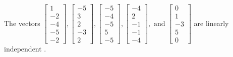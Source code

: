 \begin{exercise}
\begin{exerciseStatement}
  \end{exerciseStatement}
  \begin{exerciseAnswer}
   The vectors \(\left[\begin{array}{r}
1 \\
-2 \\
-4 \\
-5 \\
-2
\end{array}\right] , \left[\begin{array}{r}
-5 \\
3 \\
2 \\
-3 \\
2
\end{array}\right] , \left[\begin{array}{r}
-5 \\
-4 \\
-5 \\
5 \\
-5
\end{array}\right] , \left[\begin{array}{r}
-4 \\
2 \\
-1 \\
-1 \\
-4
\end{array}\right] , \text{ and } \left[\begin{array}{r}
0 \\
1 \\
-3 \\
5 \\
0
\end{array}\right]\) are 
  	 linearly independent  .
  


  \end{exerciseAnswer}
\end{exercise}
